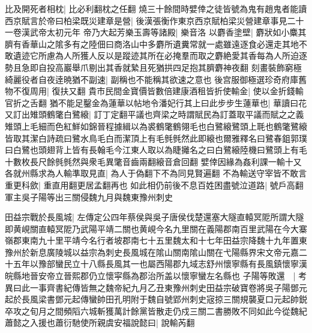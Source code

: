 比及開死者相枕|{
	比必利翻枕之任翻}
燒三十餘間時嬖倖之徒皆號為鬼有趙鬼者能讀西京賦言於帝曰柏梁既災建章是營|{
	後漢張衡作東京西京賦柏梁災營建章事見二十一卷漢武帝太初元年}
帝乃大起芳樂玉壽等諸殿|{
	樂音洛}
以麝香塗壁|{
	麝狀如小麋其臍有香華山之隂多有之陸佃曰商洛山中多麝所遺糞常就一處雖遠逐食必還走其地不敢遺迹它所慮為人所獲人反以是蹤迹其所在必掩羣而取之麝絶愛其香每為人所迫逐勢且急即自投高巖舉爪剔出其香就縶且死猶拱四足抱其臍麝神夜翻}
刻畫裝飾窮極綺麗役者自夜逹暁猶不副速|{
	副稱也不能稱其欲速之意也}
後宫服御極選珍奇府庫舊物不復周用|{
	復扶又翻}
貴市民間金寶價皆數倍建康酒租皆折使輸金|{
	使以金折錢輸官折之舌翻}
猶不能足鑿金為蓮華以帖地令潘妃行其上曰此步步生蓮華也|{
	華讀曰花}
又訂出雉頭鶴氅白鷺縗|{
	訂丁定翻平議也齊梁之時謂賦民為訂蓋取平議而賦之之義雉頭上毛細而色紅鮮如錦晉程據緝以為裘鶴氅鶴翎毛也白鷺縗鷺頭上毦也鶴氅鷺縗皆取其潔白詩疏曰鷺水鳥毛白而潔頂上有毛毿毿然此即縗也爾雅釋名曰鷺春鉏郭璞曰白鷺也頭翅背上皆有長翰毛今江東人取以為睫攡名之曰白鷺縗陸機曰鷺頭上有毛十數枚長尺餘毿毿然與衆毛異氅音齒兩翻縗音倉回翻}
嬖倖因緣為姦利課一輸十又各就州縣求為人輸準取見直|{
	為人于偽翻下不為同見賢遍翻}
不為輸送守宰皆不敢言重更科歛|{
	重直用翻更居孟翻再也}
如此相仍前後不息百姓困盡號泣道路|{
	號戶高翻}
軍主吳子陽等出三關侵魏九月與魏東豫州刺史

田益宗戰於長風城|{
	左傳定公四年蔡侯與吳子唐侯伐楚還塞大隧直轅冥阸所謂大隧即黄峴關直轅冥阸乃武陽平靖二關也黄峴今名九里關在義陽郡南百里武陽在今大寨嶺郡東南九十里平靖今名行者坡郡南七十五里魏太和十七年田益宗降魏十九年置東豫州於新息廣陵城以益宗為刺史長風城在隂山關南隂山關在弋陽縣界宋文帝元嘉二十五年以豫部蠻民立十八縣長風其一也屬西陽郡九域志舒州懷寧縣有長風鎮懷寧漢皖縣地晉安帝立晉熙郡仍立懷寜縣為郡治所盖以懷寧蠻左名縣也}
子陽等敗還　|{
	考異曰此一事齊書紀傳皆無之魏帝紀九月乙丑東豫州刺史田益宗破寶卷將吳子陽鄧元起於長風梁書鄧元起傳蠻帥田孔明附于魏自號郢州刺史宼掠三關規襲夏口元起帥鋭卒攻之旬月之間頻䧟六城斬獲萬計餘黨皆散走仍戍三關二書勝敗不同如此今從魏紀}
蕭懿之入援也蕭衍馳使所親虞安福說懿曰|{
	說輸芮翻}



